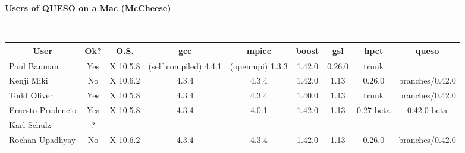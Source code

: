 \documentclass[12pt,letterpaper,twoside,onecolumn,portrait,leqno]{book}
\begin{document}
\setlength{\unitlength}{1.0in}
\setlength{\parindent}{0cm}
\setlength{\parskip}{2ex}
\thispagestyle{empty}

\centerline{\bf Users of QUESO on a Mac (McCheese)}

$~$\\

\begin{table}[!h]
\begin{center}
\begin{tabular}{|l|c|c|c|c|c|c|c|c|}
\hline
\multicolumn{1}{|c|}{User} & Ok? & O.S.     & gcc    & mpicc   & boost  & gsl   & hpct      & queso       \\
\hline
\hline
Paul Bauman                & Yes & X 10.5.8 & (self compiled) 4.4.1  & (openmpi) 1.3.3 & 1.42.0  & 0.26.0  & trunk  &             \\
\hline
Kenji Miki                 & No  & X 10.6.2 & 4.3.4  & 4.3.4   & 1.42.0 &1.13  & 0.26.0    & branches/0.42.0  \\
\hline
Todd Oliver                & Yes & X 10.5.8 & 4.3.4  & 4.3.4   & 1.40.0 & 1.13  & trunk     & branches/0.42.0   \\
\hline
Ernesto Prudencio          & Yes & X 10.5.8 & 4.3.4  & 4.0.1   & 1.42.0 & 1.13  & 0.27 beta & 0.42.0 beta \\
\hline
Karl Schulz                & ?   &          &        &         &        &       &           &             \\
\hline
Rochan Upadhyay            & No  & X 10.6.2 & 4.3.4  & 4.3.4   & 1.42.0 & 1.13  & 0.26.0    & branches/0.42.0 \\
\hline
\end{tabular}
\end{center}
\end{table}
\end{document}
